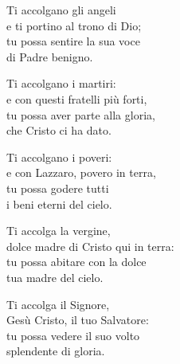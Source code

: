 

\spazio

\strofa Ti accolgano gli angeli\\
e ti portino al trono di Dio;\\
tu possa sentire la sua voce\\
di Padre benigno.

\spazio

\strofa Ti accolgano i martiri:\\
e con questi fratelli più forti,\\
tu possa aver parte	alla gloria,\\
che Cristo ci ha dato.

\spazio

\strofa Ti accolgano i poveri:\\
e con Lazzaro, povero in terra,\\
tu possa godere	tutti\\
i beni eterni del cielo.

\spazio

\strofa Ti accolga la vergine,\\
dolce madre di Cristo qui in terra:\\
tu possa abitare con la dolce\\
tua madre del cielo.

\spazio

\strofa Ti accolga il Signore,\\
Gesù Cristo, il tuo Salvatore:\\
tu possa vedere	il suo volto\\
splendente di gloria.
